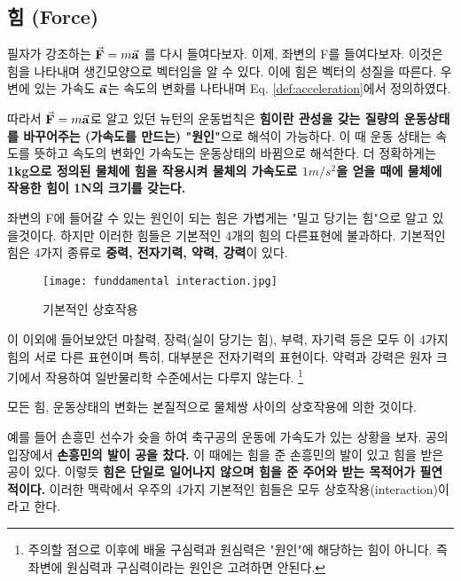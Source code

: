 \subsection{힘 (Force)}\label{sec:힘}
\begin{flushleft}
  
필자가 강조하는 $\va{F}=m\va{a}$ 를 다시 들여다보자. 이제, 좌변의 F를 들여다보자. 
이것은 힘을 나타내며 생긴모양으로 벡터임을 알 수 있다. 이에 힘은 벡터의 성질을 따른다. 
우변에 있는 가속도 $\va{a}$는 속도의 변화를 나타내며 Eq. \ref{def:acceleration}에서 정의하였다.

따라서 $\va{F}=m\va{a}$로 알고 있던 뉴턴의 운동법칙은 \textbf{힘이란 관성을 갖는 질량의 운동상태를 바꾸어주는
(가속도를 만드는) "원인"}으로 해석이 가능하다. 이 때 운동
상태는 속도를 뜻하고 속도의 변화인 가속도는 운동상태의 바뀜으로 해석한다. 
더 정확하게는 \textbf{1kg으로 정의된 물체에 힘을 작용시켜 물체의 가속도로 $1m/s^2$을 얻을 때에 물체에 작용한 힘이 
1N의 크기를 갖는다.}                                                              

좌변의 F에 들어갈 수 있는 원인이 되는 힘은 가볍게는 "밀고 당기는 힘"으로 알고 있을것이다. 하지만 이러한 힘들은 기본적인 4개의 
힘의 다른표현에 불과하다. 기본적인 힘은 4가지 종류로 \textbf{중력, 전자기력, 약력, 강력}이 있다. 

\begin{figure}[h]
  \centering
   \texttt{[image: funddamental interaction.jpg]}
   \caption{기본적인 상호작용}
 \end{figure}


이 이외에 들어보았던 마찰력, 장력(실이 당기는 힘), 부력, 자기력 등은 모두 이 4가지 힘의 서로 다른 표현이며 특히, 대부분은 전자기력의 표현이다. 
약력과 강력은 원자 크기에서 작용하여 일반물리학 수준에서는 다루지 않는다. \footnote{주의할 점으로 이후에 배울 구심력과 원심력은 
"원인"에 해당하는 힘이 아니다. 즉 좌변에 원심력과 구심력이라는 원인은 고려하면 안된다.}


모든 힘, 운동상태의 변화는 본질적으로 물체쌍 사이의 상호작용에 의한 것이다.

예를 들어 손흥민 선수가 슛을 하여 축구공의 운동에 가속도가 있는 상황을 보자. 
공의 입장에서 \textbf{손흥민의 발이 공을 찼다.} 이 때에는 힘을 준 손흥민의 발이 있고
힘을 받은 공이 있다. 이렇듯 \textbf{힘은 단일로 일어나지 않으며 힘을 준 주어와 받는 목적어가 필연적이다.} 
이러한 맥락에서 우주의 4가지 기본적인 힘들은 모두 상호작용(interaction)이라고 한다. 
\end{flushleft}





